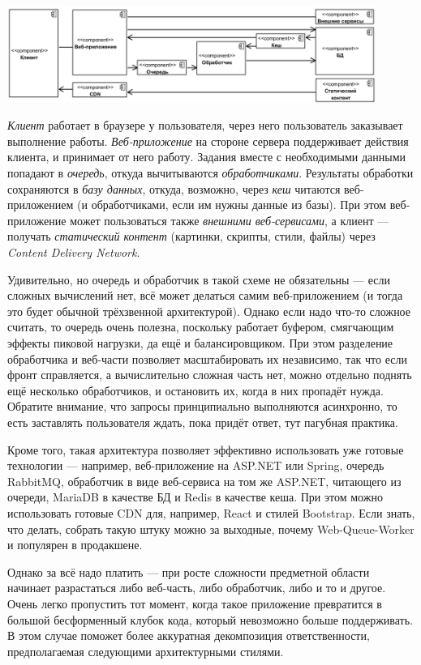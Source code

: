 \documentclass[a5paper]{article}
\begin{document}
\begin{center}
    \includegraphics[width=0.9\textwidth]{webQueueWorker.png}
\end{center}

\emph{Клиент} работает в браузере у пользователя, через него пользователь заказывает выполнение работы. \emph{Веб-приложение} на стороне сервера поддерживает действия клиента, и принимает от него работу. Задания вместе с необходимыми данными попадают в \emph{очередь}, откуда вычитываются \emph{обработчиками}. Результаты обработки сохраняются в \emph{базу данных}, откуда, возможно, через \emph{кеш} читаются веб-приложением (и обработчиками, если им нужны данные из базы). При этом веб-приложение может пользоваться также \emph{внешними веб-сервисами}, а клиент --- получать \emph{статический контент} (картинки, скрипты, стили, файлы) через \emph{Content Delivery Network}.

Удивительно, но очередь и обработчик в такой схеме не обязательны --- если сложных вычислений нет, всё может делаться самим веб-приложением (и тогда это будет обычной трёхзвенной архитектурой). Однако если надо что-то сложное считать, то очередь очень полезна, поскольку работает буфером, смягчающим эффекты пиковой нагрузки, да ещё и балансировщиком. При этом разделение обработчика и веб-части позволяет масштабировать их независимо, так что если фронт справляется, а вычислительно сложная часть нет, можно отдельно поднять ещё несколько обработчиков, и остановить их, когда в них пропадёт нужда. Обратите внимание, что запросы принципиально выполняются асинхронно, то есть заставлять пользователя ждать, пока придёт ответ, тут пагубная практика.

Кроме того, такая архитектура позволяет эффективно использовать уже готовые технологии --- например, веб-приложение на ASP.NET или Spring, очередь RabbitMQ, обработчик в виде веб-сервиса на том же ASP.NET, читающего из очереди, MariaDB в качестве БД и Redis в качестве кеша. При этом можно использовать готовые CDN для, например, React и стилей Bootstrap. Если знать, что делать, собрать такую штуку можно за выходные, почему Web-Queue-Worker и популярен в продакшене.

Однако за всё надо платить --- при росте сложности предметной области начинает разрастаться либо веб-часть, либо обработчик, либо и то и другое. Очень легко пропустить тот момент, когда такое приложение превратится в большой бесформенный клубок кода, который невозможно больше поддерживать. В этом случае поможет более аккуратная декомпозиция ответственности, предполагаемая следующими архитектурными стилями.
\end{document}
